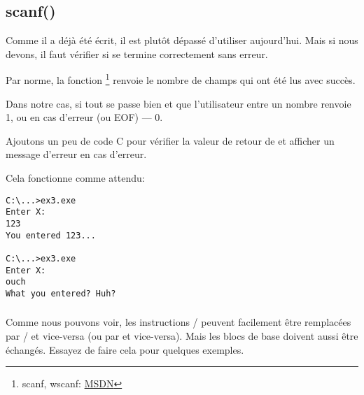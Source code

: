 \subsection{scanf()}

Comme il a déjà été écrit, il est plutôt dépassé d'utiliser \scanf aujourd'hui.
Mais si nous devons, il faut vérifier si \scanf se termine correctement sans erreur.



Par norme, la fonction \scanf\footnote{scanf, wscanf: \href{http://go.yurichev.com/17255}{MSDN}}
renvoie le nombre de champs qui ont été lus avec succès.

Dans notre cas, si tout se passe bien et que l'utilisateur entre un nombre \scanf
renvoie 1, ou en cas d'erreur (ou \ac{EOF}) --- 0.

Ajoutons un peu de code C pour vérifier la valeur de retour de \scanf et afficher
un message d'erreur en cas d'erreur.

Cela fonctionne comme attendu:

\begin{lstlisting}
C:\...>ex3.exe
Enter X:
123
You entered 123...

C:\...>ex3.exe
Enter X:
ouch
What you entered? Huh?
\end{lstlisting}






\subsubsection{\Exercise}

Comme nous pouvons voir, les instructions / peuvent facilement
être remplacées par / et vice-versa (ou  par  et vice-versa).
Mais les blocs de base doivent aussi être échangés.
Essayez de faire cela pour quelques exemples.

